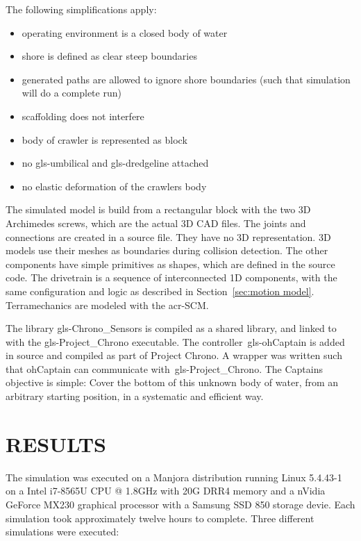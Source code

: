 \noindent The following simplifications apply:

\begin{itemize}
    \setlength\itemsep{0mm}
    \item operating environment is a closed body of water
    \item shore is defined as clear steep boundaries
    \item generated paths are allowed to ignore shore boundaries (such that simulation will do a complete run)
    \item scaffolding does not interfere
    \item body of crawler is represented as block
    \item no \gls{gls-umbilical} and \gls{gls-dredgeline} attached
    \item no elastic deformation of the crawlers body
\end{itemize}

The simulated model is build from a rectangular block with the two 3D Archimedes screws, which are the actual 3D CAD
files. The joints and connections are created in a source file. They have no 3D representation. 3D models use their
meshes as boundaries during collision detection. The other components have simple primitives as shapes, which are
defined in the source code. The drivetrain is a sequence of interconnected 1D components, with the same configuration
and logic as described in Section~\ref{sec:motion model}. Terramechanics are modeled with the \gls{acr-SCM}.

The library \gls{gls-Chrono_Sensors} is compiled as a shared library, and linked to with the \gls{gls-Project_Chrono}
executable. The controller~\gls{gls-ohCaptain} is added in source and compiled as part of Project Chrono. A wrapper
was written such that ohCaptain can communicate with~\gls{gls-Project_Chrono}. The Captains objective is simple: Cover
the bottom of this unknown body of water, from an arbitrary starting position, in a systematic and efficient way.


\section{RESULTS}\label{sec:results}

The simulation was executed on a Manjora distribution running Linux 5.4.43-1 on a Intel i7-8565U CPU @ 1.8GHz with 20G
DRR4 memory and a nVidia GeForce MX230 graphical processor with a Samsung SSD 850 storage devie. Each simulation took
approximately twelve hours to complete. Three different simulations were executed:


